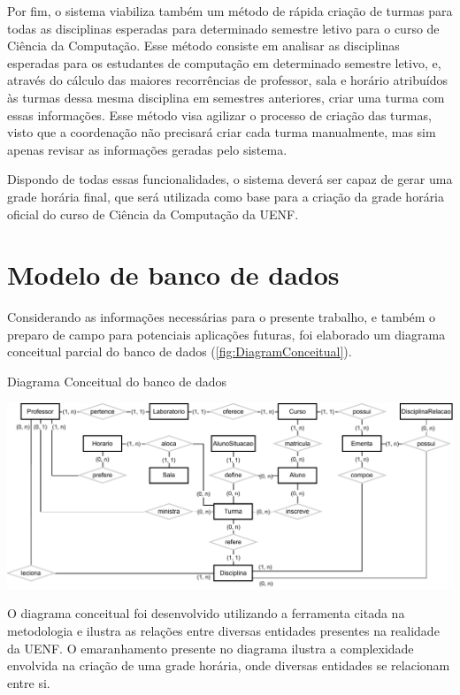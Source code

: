 Por fim, o sistema viabiliza também um método de rápida criação de turmas para todas as disciplinas esperadas para determinado semestre letivo para o curso de Ciência da Computação. Esse método consiste em analisar as disciplinas esperadas para os estudantes de computação em determinado semestre letivo, e, através do cálculo das maiores recorrências de professor, sala e horário atribuídos às turmas dessa mesma disciplina em semestres anteriores, criar uma turma com essas informações. Esse método visa agilizar o processo de criação das turmas, visto que a coordenação não precisará criar cada turma manualmente, mas sim apenas revisar as informações geradas pelo sistema.

Dispondo de todas essas funcionalidades, o sistema deverá ser capaz de gerar uma grade horária final, que será utilizada como base para a criação da grade horária oficial do curso de Ciência da Computação da UENF.

\section{Modelo de banco de dados} \label{sec:ModelagemBD} %

Considerando as informações necessárias para o presente trabalho, e também o preparo de campo para potenciais aplicações futuras, foi elaborado um diagrama conceitual parcial do banco de dados (\autoref{fig:DiagramConceitual}).

\begin{MyCenteredFigure}
  \caption{Diagrama Conceitual do banco de dados}
  \label{fig:DiagramConceitual}
  \includegraphics[width=\textwidth]{files/img/2.02!4-modelagem/Diagrama ER-Conc. Card.drawio}
\end{MyCenteredFigure}

O diagrama conceitual foi desenvolvido utilizando a ferramenta  citada na metodologia e ilustra as relações entre diversas entidades presentes na realidade da UENF. O emaranhamento presente no diagrama ilustra a complexidade envolvida na criação de uma grade horária, onde diversas entidades se relacionam entre si.

